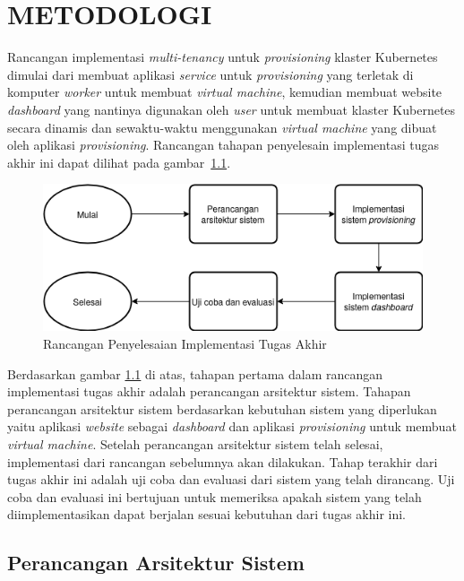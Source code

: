\chapter{METODOLOGI}
\label{chap:metodologi}

Rancangan implementasi \emph{multi-tenancy} untuk \emph{provisioning}
klaster Kubernetes dimulai dari membuat aplikasi \emph{service} untuk \emph{provisioning}
yang terletak di komputer \emph{worker} untuk membuat
\emph{virtual machine}, kemudian membuat website \emph{dashboard} yang nantinya
digunakan oleh \emph{user} untuk membuat klaster Kubernetes secara dinamis dan sewaktu-waktu
menggunakan \emph{virtual machine} yang dibuat oleh aplikasi \emph{provisioning}.
Rancangan tahapan penyelesain implementasi tugas akhir ini
dapat dilihat pada gambar~\ref{fig:top-level-implementation}.

\begin{figure}[H]
  \centering
  \includegraphics[scale=0.6]{gambar/top-level-implementation.png}
  \caption{Rancangan Penyelesaian Implementasi Tugas Akhir}
  \label{fig:top-level-implementation}
\end{figure}

Berdasarkan gambar \ref{fig:top-level-implementation} di atas, tahapan pertama
dalam rancangan implementasi tugas akhir adalah perancangan arsitektur sistem.
Tahapan perancangan arsitektur sistem berdasarkan kebutuhan sistem yang diperlukan
yaitu aplikasi \emph{website} sebagai \emph{dashboard} dan aplikasi \emph{provisioning}
untuk membuat \emph{virtual machine}. Setelah perancangan arsitektur sistem telah
selesai, implementasi dari rancangan sebelumnya akan dilakukan. Tahap terakhir
dari tugas akhir ini adalah uji coba dan evaluasi dari sistem yang telah dirancang.
Uji coba dan evaluasi ini bertujuan untuk memeriksa apakah sistem yang telah
diimplementasikan dapat berjalan sesuai kebutuhan dari tugas akhir ini.

\section{Perancangan Arsitektur Sistem}
\label{sec:perancanganarsitektursistem}

